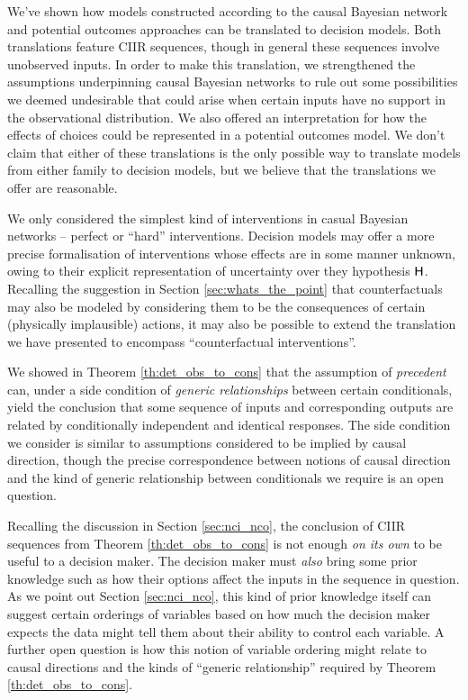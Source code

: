 We've shown how models constructed according to the causal Bayesian network and potential outcomes approaches can be translated to decision models. Both translations feature CIIR sequences, though in general these sequences involve unobserved inputs. In order to make this translation, we strengthened the assumptions underpinning causal Bayesian networks to rule out some possibilities we deemed undesirable that could arise when certain inputs have no support in the observational distribution. We also offered an interpretation for how the effects of choices could be represented in a potential outcomes model. We don't claim that either of these translations is the only possible way to translate models from either family to decision models, but we believe that the translations we offer are reasonable.

We only considered the simplest kind of interventions in casual Bayesian networks -- perfect or ``hard'' interventions. Decision models may offer a more precise formalisation of interventions whose effects are in some manner unknown, owing to their explicit representation of uncertainty over they hypothesis $\mathsf{H}$. Recalling the suggestion in Section \ref{sec:whats_the_point} that counterfactuals may also be modeled by considering them to be the consequences of certain (physically implausible) actions, it may also be possible to extend the translation we have presented to encompass ``counterfactual interventions''.

We showed in Theorem \ref{th:det_obs_to_cons} that the assumption of \emph{precedent} can, under a side condition of \emph{generic relationships} between certain conditionals, yield the conclusion that some sequence of inputs and corresponding outputs are related by conditionally independent and identical responses. The side condition we consider is similar to assumptions considered to be implied by causal direction, though the precise correspondence between notions of causal direction and the kind of generic relationship between conditionals we require is an open question.

Recalling the discussion in Section \ref{sec:nci_nco}, the conclusion of CIIR sequences from Theorem \ref{th:det_obs_to_cons} is not enough \emph{on its own} to be useful to a decision maker. The decision maker must \emph{also} bring some prior knowledge such as how their options affect the inputs in the sequence in question. As we point out Section \ref{sec:nci_nco}, this kind of prior knowledge itself can suggest certain orderings of variables based on how much the decision maker expects the data might tell them about their ability to control each variable. A further open question is how this notion of variable ordering might relate to causal directions and the kinds of ``generic relationship'' required by Theorem \ref{th:det_obs_to_cons}.

